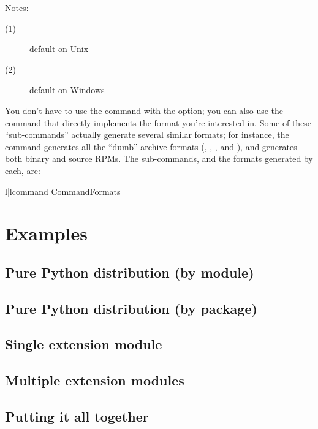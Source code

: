 \documentclass{howto}
\begin{document}
\noindent Notes:
\begin{description}
\item[(1)] default on Unix
\item[(2)] default on Windows 
\end{description}

You don't have to use the  command with the
 option; you can also use the command that
directly implements the format you're interested in.  Some of these
 ``sub-commands'' actually generate several similar
formats; for instance, the  command generates all
the ``dumb'' archive formats (, , , and
), and  generates both binary and source
RPMs.  The  sub-commands, and the formats generated by
each, are:
\begin{tableii}{l|l}{command}%
  {Command}{Formats}
\end{tableii}

\section{Examples}
\label{examples}


\subsection{Pure Python distribution (by module)}
\label{pure-mod}


\subsection{Pure Python distribution (by package)}
\label{pure-pkg}


\subsection{Single extension module}
\label{single-ext}


\subsection{Multiple extension modules}
\label{multiple-ext}


\subsection{Putting it all together}
\end{document}

